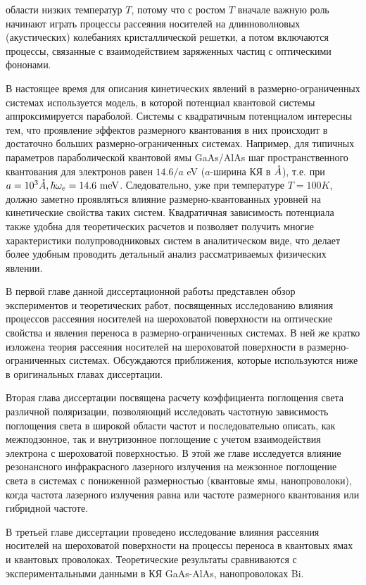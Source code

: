 области низких температур $T$, потому что с ростом $T$ вначале важную роль начинают играть процессы рассеяния носителей на длинноволновых (акустических) колебаниях кристаллической решетки, а потом включаются процессы, связанные с взаимодействием заряженных частиц с оптическими фононами.

В настоящее время для описания кинетических явлений в размерно-ограниченных системах используется модель, в которой потенциал квантовой системы аппроксимируется параболой. Системы с квадратичным потенциалом интересны тем, что проявление эффектов размерного квантования в них происходит в достаточно больших размерно-ограниченных системах. Например, для типичных параметров параболической квантовой ямы GaAs/AlAs шаг пространственного квантования для электронов равен $14.6/a$ eV ($a$-ширина КЯ в $\AA$), т.е. при $a=10^3 \AA, \hbar\omega_e = 14.6 \text{ meV}$. Следовательно, уже при температуре $T=100 K$, должно заметно проявляться влияние размерно-квантованных уровней на кинетические свойства таких систем. Квадратичная зависимость потенциала также удобна для теоретических расчетов и позволяет получить многие характеристики полупроводниковых систем в аналитическом виде, что делает более удобным проводить детальный анализ рассматриваемых физических явлении.

В первой главе данной диссертационной работы представлен обзор экспериментов и теоретических работ, посвященных исследованию влияния процессов рассеяния носителей на шероховатой поверхности на оптические свойства и явления переноса в размерно-ограниченных системах. В ней же кратко изложена теория рассеяния носителей на шероховатой поверхности в размерно-ограниченных системах. Обсуждаются приближения, которые используются ниже в оригинальных главах диссертации.

Вторая глава диссертации посвящена расчету коэффициента поглощения света различной поляризации, позволяющий исследовать частотную зависимость поглощения света в широкой области частот и последовательно описать, как межподзонное, так и внутризонное поглощение с учетом взаимодействия электрона с шероховатой поверхностью.
В этой же главе исследуется влияние резонансного инфракрасного лазерного излучения на межзонное поглощение света в системах с пониженной размерностью (квантовые ямы, нанопроволоки), когда частота лазерного излучения равна или частоте размерного квантования или гибридной частоте.

В третьей главе диссертации проведено исследование влияния рассеяния носителей на шероховатой поверхности на процессы переноса в квантовых ямах и квантовых проволоках. Теоретические результаты сравниваются с экспериментальными данными в КЯ GaAs-AlAs, нанопроволоках Bi.

